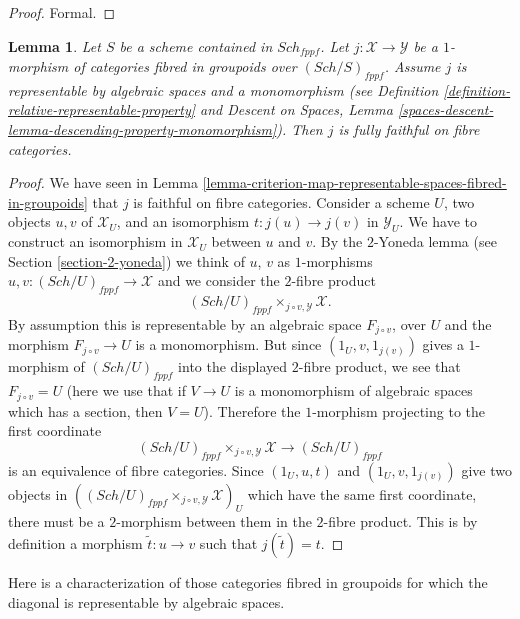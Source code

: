 \documentclass{stacks-project}
\theoremstyle{plain}
\newtheorem{lemma}[subsection]{Lemma}
\theoremstyle{definition}
\theoremstyle{remark}
\numberwithin{equation}{subsection}
\def\Sch{\mathit{Sch}}
\begin{document}
\begin{proof}
Formal.
\end{proof}

\begin{lemma}
\label{lemma-open-fibred-category-is-full}
Let $S$ be a scheme contained in $\Sch_{fppf}$.
Let $j : \mathcal X \to \mathcal Y$ be a $1$-morphism of
categories fibred in groupoids over $(\Sch/S)_{fppf}$.
Assume $j$ is representable by algebraic spaces and a monomorphism
(see
Definition \ref{definition-relative-representable-property}
and
Descent on Spaces, Lemma
\ref{spaces-descent-lemma-descending-property-monomorphism}).
Then $j$ is fully faithful on fibre categories.
\end{lemma}

\begin{proof}
We have seen in
Lemma \ref{lemma-criterion-map-representable-spaces-fibred-in-groupoids}
that $j$ is faithful on fibre categories. Consider a scheme $U$,
two objects $u, v$ of $\mathcal{X}_U$, and an isomorphism
$t : j(u) \to j(v)$ in $\mathcal{Y}_U$. We have to construct an
isomorphism in $\mathcal{X}_U$ between $u$ and $v$.
By the $2$-Yoneda lemma (see Section \ref{section-2-yoneda})
we think of $u$, $v$ as $1$-morphisms
$u, v : (\Sch/U)_{fppf} \to \mathcal{X}$
and we consider the $2$-fibre product
$$
(\Sch/U)_{fppf} \times_{j \circ v, \mathcal{Y}} \mathcal{X}.
$$
By assumption this is representable by an algebraic space
$F_{j \circ v}$, over $U$ and the morphism
$F_{j \circ v} \to U$ is a monomorphism.
But since $(1_U, v, 1_{j(v)})$ gives a $1$-morphism of
$(\Sch/U)_{fppf}$ into the displayed $2$-fibre product,
we see that $F_{j \circ v} = U$ (here we use
that if $V \to U$ is a monomorphism of algebraic spaces which has a
section, then $V = U$). Therefore the $1$-morphism projecting to
the first coordinate
$$
(\Sch/U)_{fppf} \times_{j \circ v, \mathcal{Y}} \mathcal{X}
\to (\Sch/U)_{fppf}
$$
is an equivalence of fibre categories.
Since $(1_U, u, t)$ and $(1_U, v, 1_{j(v)})$ give two
objects in $((\Sch/U)_{fppf} \times_{j \circ v, \mathcal{Y}}
\mathcal{X})_U$ which have the same first coordinate, there must
be a $2$-morphism between them in the $2$-fibre product.
This is by definition a morphism $\tilde t : u \to v$ such that
$j(\tilde t) = t$.
\end{proof}

\noindent
Here is a characterization of those categories fibred in groupoids
for which the diagonal is representable by algebraic spaces.
\end{document}
